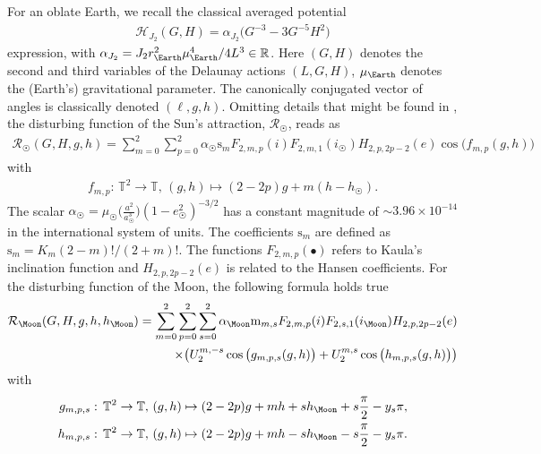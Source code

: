 \documentclass{amsart}
\theoremstyle{definition}
\theoremstyle{remark}
\numberwithin{equation}{section}
\begin{document}
For an oblate Earth, we {\color{black}recall} the classical {\color{black}averaged} potential 
\begin{align}
	\mathcal{H}_{J_{2}}(G,H)= \alpha_{J_{2}}  \big(G^{-3}-3G^{-5}H^{2}\big)
\end{align}
expression, with $\alpha_{J_{2}}=J_{2}r_{\Earth}^{2}\mu_{\Earth}^{4}/4L^{3} \in \mathbb{R}$. Here $(G,H)$ denotes the second and third {\color{black}variables} {\color{black}of the Delaunay actions $(L,G,H)$}, {\color{black} $\mu_{\Earth}$ denotes the (Earth's) gravitational parameter}. The canonically conjugated vector of angles is classically denoted $(\ell,g,h)$.
Omitting details that might be found in \cite{aCe16-siam,aCe17}, 
the disturbing function of the Sun's attraction, $\mathcal{R}_{\Sun}$, reads as
\begin{align}\label{Eq:R-Sun}
	\mathcal{R}_{\Sun}(G,H,g,h)= \sum_{m=0}^{2} \sum_{p=0}^{2} \alpha_{\Sun} \textrm{s}_{m}
	F_{2,m,p}(i)F_{2,m,1}(i_{\Sun})H_{2,p,2p-2}(e)\cos\big(f_{m,p}(g,h)\big)
\end{align}
with
\begin{align}
f_{m,p}: \, \mathbb{T}^{2} \to \mathbb{T}, \,  (g,h)\mapsto(2-2p)g + m(h-h_{\Sun}).
\end{align}
The scalar $\alpha_{\Sun}=\mu_{\Sun} \Big(\frac{a^{2}}{a_{\Sun}^{3}}\Big)(1-e_{\Sun}^{2})^{-3/2}$ has a constant magnitude of  $\sim 3.96 \times 10^{-14}$ in the international system of units.
The coefficients $\textrm{s}_{m}$ are defined as $\textrm{s}_{m}=K_{m} (2-m)!/(2+m)!$. 
{\color{black} The functions $F_{2,m,p}(\bullet)$ refers to Kaula's inclination function \citep{wKa66} and $H_{2,p,2p-2}(e)$ is related to {\color{black}the Hansen coefficients}.}
For the disturbing function of the Moon, the following formula holds true 
\begin{align}\label{Eq:R-Moon}
	\mathcal{R}_{\Moon}(G,H,g,h,h_{\Moon})= 
	\sum_{m=0}^{2} \sum_{p=0}^{2} \sum_{s=0}^{2}
	\alpha_{\Moon}
	\textrm{m}_{m,s}
	F_{2,m,p}(i)F_{2,s,1}(i_{\Moon})H_{2,p,2p-2}(e)\\ \notag
	\times 
	\big(
	U_{2}^{m,-s}\cos\big(g_{m,p,s}(g,h)\big)
	+
        U_{2}^{m,s}\cos\big(h_{m,p,s}(g,h)\big)
	\big)
\end{align}
with
\begin{align}
g_{m,p,s}: \, \mathbb{T}^{2} \to \mathbb{T}, \,  (g,h)\mapsto(2-2p)g + mh +s h_{\Moon} + s \frac{\pi}{2}-y_{s}\pi, \\ 
h_{m,p,s}: \, \mathbb{T}^{2} \to \mathbb{T}, \,  (g,h)\mapsto(2-2p)g + mh -s h_{\Moon} - s \frac{\pi}{2}-y_{s}\pi. 
\end{align}
\end{document}
